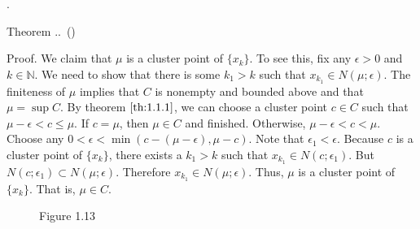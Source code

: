 \documentclass[8pt]{beamer}
\newcounter{thm}
\newcounter{ex}
\renewcommand{\thethm}{\thesection.\thesubsection.\arabic{thm}}
\renewenvironment{theorem}[1][]{%
    \refstepcounter{thm}%
    \begin{block}{Theorem \thethm\if\relax\detokenize{#1}\relax\else\ (#1)\fi}%
    \itshape
}{%
    \end{block}%
}
\newcommand{\mbb}[1]{\mathbb{#1}}
\begin{document}
\begin{frame}{.}
\begin{theorem}
        Proof.
        We claim that $\mu$ is a cluster point of $\{x_k\}$.
        To see this, fix any $\epsilon >0$ and $k \in \mbb{N}$.
        We need to show that there is some $k_1>k$ such that $x_{k_1} \in N(\mu; \epsilon)$.
        The finiteness of $\mu$ implies that $C$ is nonempty and bounded above and that $\mu=\sup C$.
        By theorem $\ref{th:1.1.1}$, we can choose a cluster point $c \in C$ such that $\mu - \epsilon <c \le \mu$.
        If $c = \mu$, then $\mu \in C$ and finished.
        Otherwise, $\mu-\epsilon < c < \mu$.
        Choose any $0<\epsilon < \min(c - (\mu- \epsilon), \mu-c)$.
        Note that $\epsilon_1 < \epsilon$.
        Because $c$ is a cluster point of $\{x_k\}$, there exists a $k_1>k$ such that $x_{k_1} \in N(c; \epsilon_1)$.
        But $N(c; \epsilon_1) \subset N(\mu; \epsilon)$.
        Therefore $x_{k_1} \in N(\mu; \epsilon)$.
        Thus, $\mu$ is a cluster point of $\{x_k\}$.
        That is, $\mu \in C$.
    \end{theorem}
    \begin{figure}[h]
        \centering
        \caption{Figure 1.13}
    \end{figure}
\end{frame}
\end{document}
